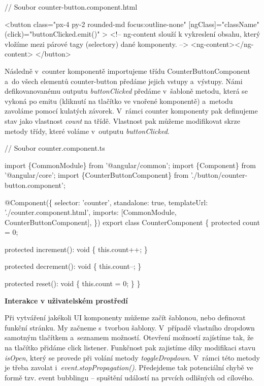 \begin{prog}
// Soubor counter-button.component.html

<button
  class="px-4 py-2 rounded-md focus:outline-none"
  [ngClass]="className"
  (click)="buttonClicked.emit()"
>
  <!-- ng-content slouží k vykreslení obsahu, který vložíme
    mezi párové tagy (selectory) dané komponenty. -->
  <ng-content></ng-content>
</button>
\end{prog}

Následně v~counter komponentě importujeme třídu CounterButtonComponent a~do všech elementů counter-button předáme jejich vstupy a~výstupy. 
Námi defikovanovanému outputu \emph{buttonClicked} předáme v~šabloně metodu, která se vykoná po emitu (kliknutí na tlačítko ve vnořené komponentě) a~metodu zavoláme pomocí kulatých závorek. 
V~rámci counter komponenty pak definujeme stav jako vlastnost \emph{count} na třídě. Vlastnost pak můžeme modifikovat skrze metody třídy, které voláme v~outputu \emph{buttonClicked}.

\begin{prog}
// Soubor counter.component.ts

import \{CommonModule\} from '@angular/common';
import \{Component\} from '@angular/core';
import \{CounterButtonComponent\} from './button/counter-button.component';

@Component(\{
  selector: 'counter',
  standalone: true,
  templateUrl: './counter.component.html',
  imports: [CommonModule, CounterButtonComponent],
\})
export class CounterComponent \{
  protected count = 0;

  protected increment(): void \{
    this.count++;
  \}

  protected decrement(): void \{
    this.count--;
  \}

  protected reset(): void \{
    this.count = 0;
  \}
\}
\end{prog}

\begin{flushleft}
  \textbf{Interakce v uživatelském prostředí}
\end{flushleft}

Při vytváření jakékoli UI komponenty můžeme začít šablonou, nebo definovat funkční stránku. My začneme s~tvorbou šablony. V~případě vlastního dropdown samotným tlačítkem a~seznamem možností. 
Otevření možností zajístíme tak, že na tlačítko přidáme click listener. Funkčnost pak zajistíme díky modifikaci stavu \emph{isOpen}, který se provede při volání metody \emph{toggleDropdown}. 
V~rámci této metody je třeba zavolat i~\emph{event.stopPropagation()}. Předejdeme tak potenciální chybě ve formě tzv. event bubblingu -- spuštění událostí na prvcích odlišných od cílového.

